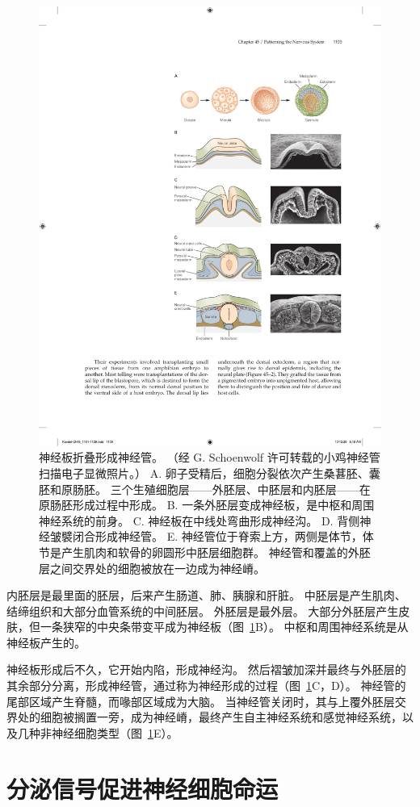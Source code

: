\begin{figure}[htbp]
	\centering
	\includegraphics[width=0.65\linewidth]{chap45/fig_45_1}
	\caption{神经板折叠形成神经管。 （经 G. Schoenwolf 许可转载的小鸡神经管扫描电子显微照片。） A. 卵子受精后，细胞分裂依次产生桑葚胚、囊胚和原肠胚。 三个生殖细胞层——外胚层、中胚层和内胚层——在原肠胚形成过程中形成。 B. 一条外胚层变成神经板，是中枢和周围神经系统的前身。 C. 神经板在中线处弯曲形成神经沟。 D. 背侧神经皱襞闭合形成神经管。 E. 神经管位于脊索上方，两侧是体节，体节是产生肌肉和软骨的卵圆形中胚层细胞群。 神经管和覆盖的外胚层之间交界处的细胞被放在一边成为神经嵴。}
	\label{fig:45_1}
\end{figure}


内胚层是最里面的胚层，后来产生肠道、肺、胰腺和肝脏。
中胚层是产生肌肉、结缔组织和大部分血管系统的中间胚层。
外胚层是最外层。
大部分外胚层产生皮肤，但一条狭窄的中央条带变平成为神经板（图~\ref{fig:45_1}B）。
中枢和周围神经系统是从神经板产生的。


神经板形成后不久，它开始内陷，形成神经沟。
然后褶皱加深并最终与外胚层的其余部分分离，形成神经管，通过称为神经形成的过程（图~\ref{fig:45_1}C，D）。
神经管的尾部区域产生脊髓，而喙部区域成为大脑。
当神经管关闭时，其与上覆外胚层交界处的细胞被搁置一旁，成为神经嵴，最终产生自主神经系统和感觉神经系统，以及几种非神经细胞类型（图~\ref{fig:45_1}E）。



\section{分泌信号促进神经细胞命运}

